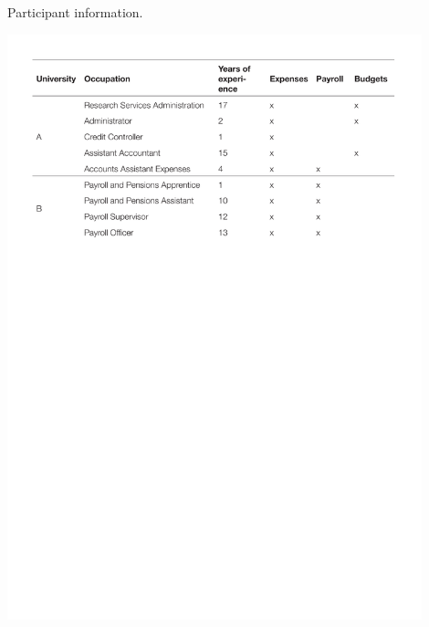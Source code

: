 \begin{table}
\caption{Participant information.}
\centering
\includegraphics[width=0.9\textwidth]{images/ch12/Study1-Table1.pdf}
\vspace{-3pt}
\label{tbl:ch12-Table1}
\end{table}

